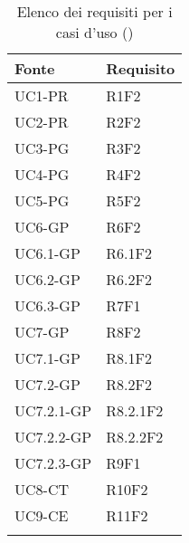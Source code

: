 

		\setcounter{tableCounter}{1}
		\begin{table}[H]
			\centering
			{\def\arraystretch{1.5}
			\begin{tabularx}{0.7\textwidth}{YY}
				\textbf{Fonte} & \textbf{Requisito} \\
				\toprule
				UC1-PR & R1F2 \\
				UC2-PR & R2F2 \\
				UC3-PG & R3F2 \\
				UC4-PG & R4F2 \\
				UC5-PG & R5F2 \\
				UC6-GP & R6F2 \\
				UC6.1-GP & R6.1F2 \\
				UC6.2-GP & R6.2F2 \\
				UC6.3-GP & R7F1 \\
				UC7-GP & R8F2 \\
				UC7.1-GP & R8.1F2 \\
				UC7.2-GP & R8.2F2 \\
				UC7.2.1-GP & R8.2.1F2 \\
				UC7.2.2-GP & R8.2.2F2 \\
				UC7.2.3-GP & R9F1 \\
				UC8-CT & R10F2 \\
				UC9-CE & R11F2 \\
				\bottomrule \\
			\end{tabularx}}
			\caption{Elenco dei requisiti per i casi d'uso (\thetableCounter)}
		\end{table}


